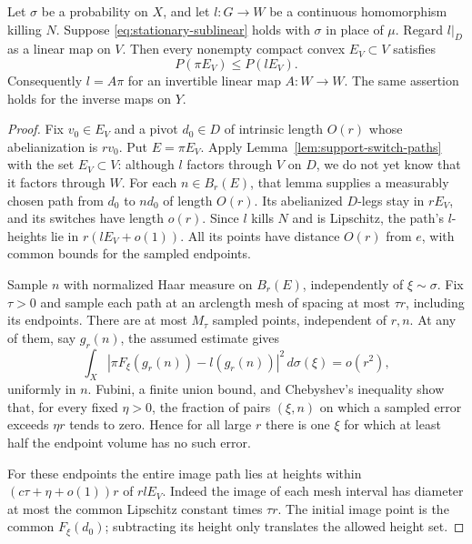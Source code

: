 \begin{lemma}
\label{lem:stationary-volume}
Let $\sigma$ be a probability on $X$, and let $l:G\to W$ be a
continuous homomorphism killing $N$.  Suppose
\eqref{eq:stationary-sublinear} holds with $\sigma$ in place of
$\mu$.  Regard $l|_D$ as a linear map on $V$.  Then every nonempty
compact convex $E_V\subset V$ satisfies
\begin{equation}\label{eq:forward-slope-volume}
 P(\pi E_V)\le P(lE_V).
\end{equation}
Consequently $l=A\pi$ for an invertible linear map $A:W\to W$.
The same assertion holds for the inverse maps on $Y$.
\end{lemma}

\begin{proof}
Fix $v_0\in E_V$ and a pivot $d_0\in D$ of intrinsic length $O(r)$
whose abelianization is $rv_0$.  Put $E=\pi E_V$.  Apply
Lemma~\ref{lem:support-switch-paths} with the set $E_V\subset V$:
although $l$ factors through $V$ on $D$, we do not yet know that it
factors through $W$.  For each $n\in B_r(E)$, that lemma supplies a
measurably chosen path from $d_0$ to $nd_0$ of length $O(r)$.
Its abelianized $D$-legs stay in $rE_V$, and its switches have length
$o(r)$.  Since $l$ kills $N$ and is Lipschitz, the path's $l$-heights
lie in $r(lE_V+o(1))$.  All its points have distance $O(r)$ from $e$,
with common bounds for the sampled endpoints.

Sample $n$ with normalized Haar measure on $B_r(E)$, independently
of $\xi\sim\sigma$.  Fix $\tau>0$ and sample each path at an
arclength mesh of spacing at most $\tau r$, including its endpoints.
There are at most $M_\tau$ sampled points, independent of $r,n$.
At any of them, say $g_r(n)$, the assumed estimate gives
\[
 \int_X|\pi F_\xi(g_r(n))-l(g_r(n))|^2\,d\sigma(\xi)=o(r^2),
\]
uniformly in $n$.  Fubini, a finite union bound, and Chebyshev's
inequality show that, for every fixed $\eta>0$, the fraction of pairs
$(\xi,n)$ on which a sampled error exceeds $\eta r$ tends to zero.
Hence for all large $r$ there is one $\xi$ for which at least half
the endpoint volume has no such error.

For these endpoints the entire image path lies at heights within
$(c\tau+\eta+o(1))r$ of $r lE_V$.  Indeed the image of each mesh
interval has diameter at most the common Lipschitz constant times
$\tau r$.  The initial image point is the common $F_\xi(d_0)$;
subtracting its height only translates the allowed height set.


\end{proof}
